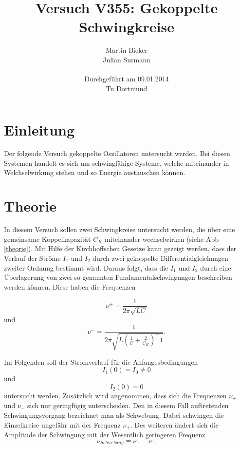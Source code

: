 \documentclass[11pt,ngerman,a4paper]{article}
\title{\textbf{Versuch V355: Gekoppelte Schwingkreise}}
\author{Martin Bieker\\
		Julian Surmann\\
		\\
		Durchgef\"{u}hrt am 09.01.2014\\
		Tu Dortmund}
\date{}
\begin{document}
\renewcommand\tablename{Tabelle}
\renewcommand\figurename{Abbildung}
\maketitle
\thispagestyle{empty}
\newpage
\clearpage
\setcounter{page}{1}


\section{Einleitung}
Der folgende Versuch gekoppelte Oszillatoren untersucht werden. Bei diesen Systemen handelt es sich um schwingfähige Systeme, welche miteinander in Welchselwirkung stehen und so Energie austauschen können. 

\section{Theorie}

In diesem Versuch sollen zwei Schwingkreise untersucht werden, die über eine gemeinsame Koppelkapazität $C_K$ miteinander wechselwirken (siehe Abb \ref{theorie}). Mit Hilfe der Kirchhoffschen Gesetze kann gezeigt werden, dass der Verlauf der Ströme $I_1$ und $I_2$ durch zwei gekoppelte Differentialgleichungen zweiter Ordnung bestimmt wird. Daraus folgt, dass die $I_1$ und $I_2$ durch eine Überlagerung von zwei so genannten Fundamentalschwingungen beschreiben werden können. Diese haben die Frequenzen


\begin{equation}
\nu^+ = \frac{1}{2 \pi \sqrt{LC}}
\label{nueplus}
\end{equation}
und 
\begin{equation}
\nu^- =\frac1{2\pi\sqrt{L(\frac1C + \frac2{C_K})^-1}}.
\label{nueminus}
\end{equation}

\noindent
Im Folgenden soll der Stromverlauf für die Anfangesbedingungen
\[
I_1(0) = I_0 \neq 0
\] 
und 
\[
I_2(0) = 0
\]
untersucht werden. Zusätzlich wird angenommen, dass sich die Frequenzen $\nu_+$  und $\nu_-$ sich nur geringfügig unterscheiden. Den in diesem Fall auftretenden Schwingungsvorgang bezeichnet man als Schwebung. Dabei schwingen die Einzelkreise ungefähr mit der Frequenz $\nu_+$. Des weiteren ändert sich die Amplitude der Schwingung mit der Wesentlich geringeren Frequenz 
\begin{equation}
\nu_{Schwebung} = \nu_- - \nu_+
\end{equation}
\end{document}

